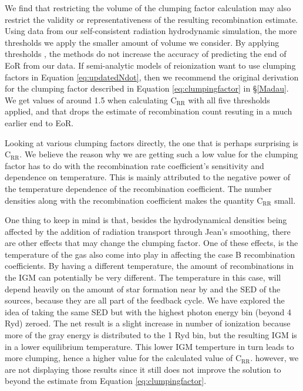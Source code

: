 We find that restricting the volume of the clumping factor calculation may also restrict the validity or representativeness of the resulting recombination estimate.  Using data from our self-consistent radiation hydrodynamic simulation, the more thresholds we apply the smaller amount of volume we consider.  By applying thresholds \citep{PawlikEtAl2009, RaicevicTheuns2011, ShullEtAl2012, FinlatorEtAl2012}, the methods do not increase the accuracy of predicting the end of EoR from our data. If semi-analytic models of reionization want to use clumping factors in Equation \eqref{eq:updatedNdot}, then we recommend the original derivation for the clumping factor described in Equation \eqref{eq:clumpingfactor} in \S\ref{Madau}.  We get values of around 1.5 when calculating C$_\mathrm{RR}$ with all five thresholds applied, and that drops the estimate of  recombination count resuting in a much earlier end to EoR.

Looking at various clumping factors directly, the one that is perhaps surprising is C$_\mathrm{RR}$.  We believe the reason why we are getting such a low value for the clumping factor has to do with the recombination rate coefficient's sensitivity and dependence on temperature.  This is mainly attributed to the negative power of the temperature dependence of the recombination coefficient.  The number densities along with the recombination coefficient makes the quantity C$_\mathrm{RR}$ small.  

One thing to keep in mind is that, besides the hydrodynamical densities being affected by the addition of radiation transport through Jean's smoothing, there are other effects that may change the clumping factor.  One of these effects, is the temperature of the gas also come into play in affecting the case B recombination coefficients.  By having a different temperature, the amount of recombinations in the IGM can potentially be very different.  The temperature in this case, will depend heavily on the amount of star formation near by and the SED of the sources, because they are all part of the feedback cycle.  We have explored the idea of taking the same SED but with the highest photon energy bin (beyond 4 Ryd) zeroed.  The net result is a slight increase in number of ionization because more of the gray energy is distributed to the 1 Ryd bin, but the resulting IGM is in a lower equilibrium temperature.  This lower IGM temperture in turn leads to more clumping, hence a higher value for the calculated value of C$_\mathrm{RR}$.  however, we are not displaying those results since it still does not improve the solution to beyond the estimate from Equation \eqref{eq:clumpingfactor}.

